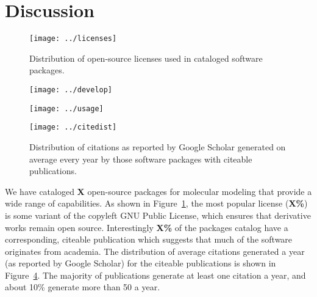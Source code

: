 \section{Discussion}

\begin{figure}
\centering 
\texttt{[image: ../licenses]}
\caption{\label{licenses} Distribution of open-source licenses used in cataloged software packages.}
\end{figure}

\begin{figure*}
\centering
\begin{subfigure}[t]{.4\linewidth}
\centering \label{develop}
\texttt{[image: ../develop]}
\end{subfigure}
\hfill
\begin{subfigure}[t]{.4\linewidth}
\centering \label{usage}
\texttt{[image: ../usage]}
\end{subfigure}
\caption{\label{pies} Activity distributions of cataloged software packages.
 Distribution of development activity.  Distribution of user activity.
}
\end{figure*}

\begin{figure}
\centering 
\texttt{[image: ../citedist]}
\caption{\label{cites} Distribution of citations as reported by Google Scholar generated on average every year by those software packages with citeable publications.}
\end{figure}


We have cataloged \textbf{X} open-source packages for molecular modeling that provide a wide range of capabilities.  As shown in Figure~\ref{licenses}, the most popular license (\textbf{X\%}) is some variant of the copyleft GNU Public License, which ensures that derivative works remain open source.  Interestingly \textbf{X\%} of the packages catalog have a corresponding, citeable publication which suggests that much of the software originates from academia.   The distribution of average citations generated a year (as reported by Google Scholar) for the citeable publications is shown in Figure~\ref{cites}.  The majority of publications generate at least one citation a year, and about 10\% generate more than 50 a year.

